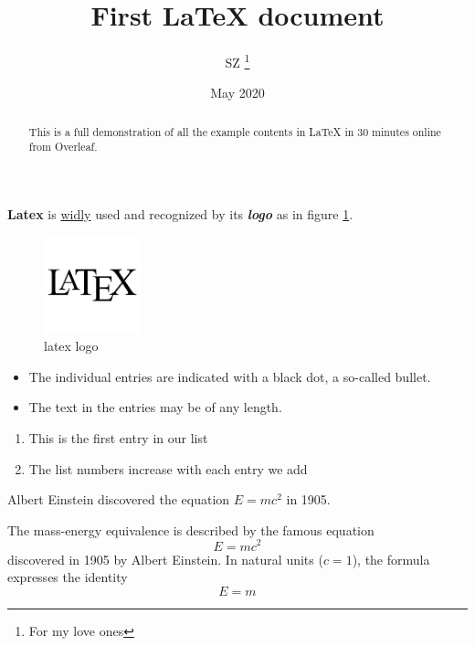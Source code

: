 \documentclass[12pt, letterpaper, twoside]{article}
\title{First \LaTeX{} document}
\author{SZ \thanks{For my love ones}}
\date{May 2020}
\begin{document}
\maketitle

\begin{abstract}
This is a full demonstration of all the example contents in \LaTeX{} in 30 minutes online from Overleaf.
\end{abstract}

\textbf{Latex} is \underline{widly} used and recognized by its \textbf{\textit{logo}} as in figure \ref{fig:logo}. 

\begin{figure}[h]
    \centering
    \includegraphics[width=0.25\textwidth]{latex}
    \caption{latex logo}
    \label{fig:logo}
\end{figure}

\begin{itemize}
  \item The individual entries are indicated with a black dot, a so-called bullet.
  \item The text in the entries may be of any length.
\end{itemize}

\begin{enumerate}
  \item This is the first entry in our list
  \item The list numbers increase with each entry we add
\end{enumerate}

Albert Einstein discovered the equation $E=mc^2$ in 1905.


The mass-energy equivalence is described by the famous equation
\[ E=mc^2 \]
discovered in 1905 by Albert Einstein. 
In natural units ($c = 1$), the formula expresses the identity
\begin{equation}
E=m
\end{equation}
\end{document}
